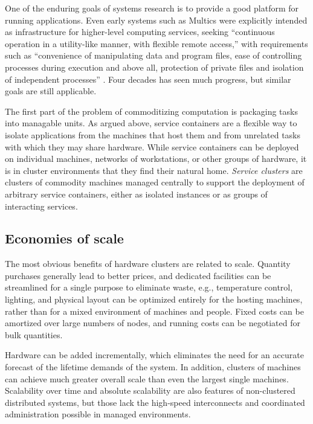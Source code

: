 One of the enduring goals of systems research is to provide a good platform for running applications. Even early systems such as Multics were explicitly intended as infrastructure for higher-level computing services, seeking ``continuous operation in a utility-like manner, with flexible remote access,'' with requirements such as ``convenience of manipulating data and program files, ease of controlling processes during execution and above all, protection of private files and isolation of independent processes'' \cite{corbato}. Four decades has seen much progress, but similar goals are still applicable.

The first part of the problem of commoditizing computation is packaging tasks into managable units. As argued above, service containers are a flexible way to isolate applications from the machines that host them and from unrelated tasks with which they may share hardware. While service containers can be deployed on individual machines, networks of workstations, or other groups of hardware, it is in cluster environments that they find their natural home. \emph{Service clusters} are clusters of commodity machines managed centrally to support the deployment of arbitrary service containers, either as isolated instances or as groups of interacting services.

\subsection{Economies of scale}

The most obvious benefits of hardware clusters are related to scale. Quantity purchases generally lead to better prices, and dedicated facilities can be streamlined for a single purpose to eliminate waste, e.g., temperature control, lighting, and physical layout can be optimized entirely for the hosting machines, rather than for a mixed environment of machines and people. Fixed costs can be amortized over large numbers of nodes, and running costs can be negotiated for bulk quantities.

Hardware can be added incrementally, which eliminates the need for an accurate forecast of the lifetime demands of the system. In addition, clusters of machines can achieve much greater overall scale than even the largest single machines. Scalability over time and absolute scalability are also features of non-clustered distributed systems, but those lack the high-speed interconnects and coordinated administration possible in managed environments.

